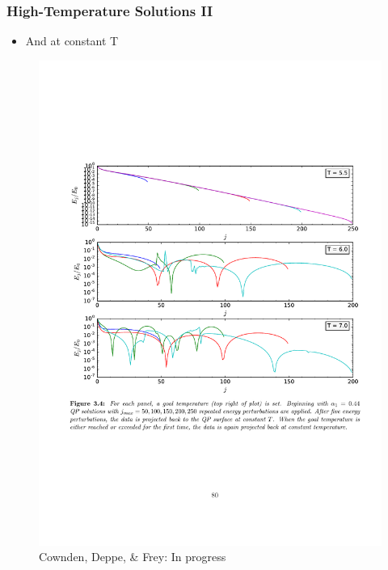 \documentclass[mathserif,10pt]{beamer}
\newcommand{\bi}{\begin{itemize}}
\newcommand{\ei}{\end{itemize}}
\newcommand{\its}{\item}
\newcommand{\scr}{\scriptsize}
\begin{document}
\frame
{
  \frametitle{High-Temperature Solutions II}
  \bi
  \its And at \alert{constant T}
  \ei
   \begin{figure}
    \centering
    \includegraphics[scale=0.4]{constantTproj} \\ {\scr Cownden, Deppe, \& Frey: In progress}
  \end{figure}
}
\end{document}
